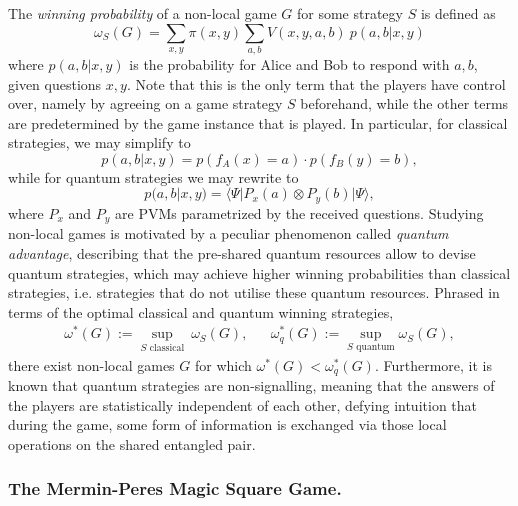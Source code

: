 The \emph{winning probability} of a non-local game $G$ for some strategy $S$ is defined as
\[ \omega_S(G) = \sum_{x,y} \pi(x, y) \sum_{a,b} V(x,y,a,b)~p(a,b|x,y) \]
where $p(a,b|x,y)$ is the probability for Alice and Bob to respond with $a,b$, given questions $x,y$.
Note that this is the only term that the players
have control over, namely by agreeing on a game strategy $S$ beforehand,
while the other terms are predetermined by the game instance that is played.
In particular, for classical strategies, we may simplify to
\[ p(a,b|x,y) = p\left(f_A(x) = a\right) \cdot p\left(f_B(y) = b\right), \]
while for quantum strategies we may rewrite to
\[ p(a,b|x,y) = \langle \Psi| P_x(a) \otimes P_y(b) |\Psi\rangle, \]
where $P_x$ and $P_y$ are PVMs parametrized by the received questions.
%
Studying non-local games is motivated by a peculiar phenomenon called \emph{quantum advantage},
describing that the pre-shared quantum resources allow to devise quantum strategies,
which may achieve higher winning probabilities than classical strategies,
i.e. strategies that do not utilise these quantum resources.
Phrased in terms of the optimal classical and quantum winning strategies,
\begin{align*}
    \omega^*(G) := \sup_{S \textrm{ classical}}~\omega_S(G), & & \omega_q^*(G) := \sup_{S \textrm{ quantum}} \omega_S(G),
\end{align*}
there exist non-local games $G$ for which $\omega^*(G) < \omega_q^*(G)$.
%
Furthermore, it is known that quantum strategies are non-signalling,
meaning that the answers of the players are statistically independent of each other,
defying intuition that during the game, some form of information is exchanged
via those local operations on the shared entangled pair.


\subsubsection{The Mermin-Peres Magic Square Game.}\label{sec:magic-square}

